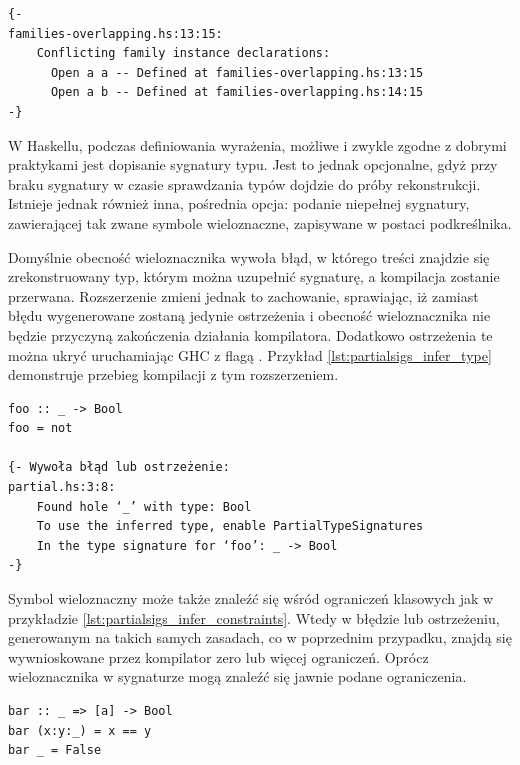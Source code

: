 {\begin{lstlisting}[float,label={lst:typefams_open_close},
                   caption={Przykład otwartej i zamkniętej funkcji na typach z nachodzącymi na siebie dziedzinami.}]
{-
families-overlapping.hs:13:15:
    Conflicting family instance declarations:
      Open a a -- Defined at families-overlapping.hs:13:15
      Open a b -- Defined at families-overlapping.hs:14:15
-}
\end{lstlisting}

\label{sec:partial_sigs}

W Haskellu, podczas definiowania wyrażenia, możliwe i zwykle zgodne z dobrymi
praktykami jest dopisanie sygnatury typu. Jest to jednak opcjonalne, gdyż przy
braku sygnatury w czasie sprawdzania typów dojdzie do próby
rekonstrukcji. Istnieje jednak również inna, pośrednia opcja: podanie niepełnej
sygnatury, zawierającej tak zwane symbole wieloznaczne, zapisywane w postaci
podkreślnika.

Domyślnie obecność wieloznacznika wywoła błąd, w którego treści znajdzie się
zrekonstruowany typ, którym można uzupełnić sygnaturę, a kompilacja zostanie
przerwana. Rozszerzenie  zmieni jednak to
zachowanie, sprawiając, iż zamiast błędu wygenerowane zostaną jedynie
ostrzeżenia i obecność wieloznacznika nie będzie przyczyną zakończenia działania
kompilatora. Dodatkowo ostrzeżenia te można ukryć uruchamiając GHC z flagą
. Przykład
\ref{lst:partialsigs_infer_type} demonstruje przebieg kompilacji z tym
rozszerzeniem.

\begin{lstlisting}[float,label={lst:partialsigs_infer_type},
                   caption={Przykład użycia anonimowego symbolu wieloznacznego w sygnaturze typu.}]
foo :: _ -> Bool
foo = not

{- Wywoła błąd lub ostrzeżenie:
partial.hs:3:8:
    Found hole ‘_’ with type: Bool
    To use the inferred type, enable PartialTypeSignatures
    In the type signature for ‘foo’: _ -> Bool
-}
\end{lstlisting}

Symbol wieloznaczny może także znaleźć się wśród ograniczeń klasowych jak w
przykładzie \ref{lst:partialsigs_infer_constraints}. Wtedy w błędzie lub
ostrzeżeniu, generowanym na takich samych zasadach, co w poprzednim przypadku,
znajdą się wywnioskowane przez kompilator zero lub więcej ograniczeń. Oprócz
wieloznacznika w sygnaturze mogą znaleźć się jawnie podane ograniczenia.

\begin{lstlisting}[float,label={lst:partialsigs_infer_constraints},
                   caption={Przykład użycia anonimowego symbolu wieloznacznego w ograniczeniach typu.}]
bar :: _ => [a] -> Bool
bar (x:y:_) = x == y
bar _ = False


\end{lstlisting}}
